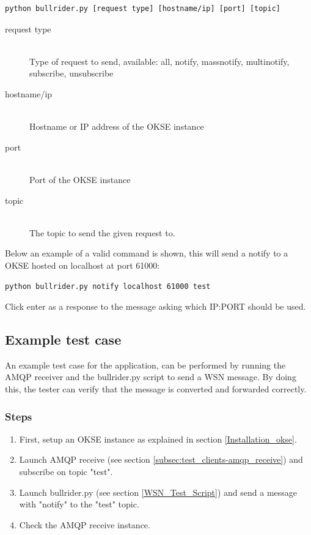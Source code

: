 \begin{verbatim}
python bullrider.py [request type] [hostname/ip] [port] [topic]
\end{verbatim}


\begin{description}
    \item[request type] \hfill \\
  Type of request to send, available: all, notify, massnotify, multinotify, subscribe, unsubscribe \hfill 
    \item[hostname/ip] \hfill \\
  Hostname or IP address of the OKSE instance \hfill 
    \item[port] \hfill \\
  Port of the OKSE instance \hfill 
    \item[topic] \hfill \\
  The topic to send the given request to. \hfill 
\end{description}
Below an example of a valid command is shown, this will send a notify to a OKSE hosted on localhost at port 61000:

\begin{verbatim}
python bullrider.py notify localhost 61000 test
\end{verbatim}
Click enter as a response to the message asking which IP:PORT should be used.

\subsection{Example test case}

An example test case for the application, can be performed by running the AMQP receiver and the bullrider.py script to send a WSN message. By doing this, the tester can verify that the message is converted and forwarded correctly.

\subsubsection{Steps}
\begin{enumerate}
\item First, setup an OKSE instance as explained in section  \ref{Installation_okse}. 
\item Launch AMQP receive (see section \ref{subsec:test_clients-amqp_receive}) and subscribe on topic "test". 
\item Launch bullrider.py (see section \ref{WSN_Test_Script}) and send a message with "notify" to the "test" topic. 
\item Check the AMQP receive instance.
\end{enumerate}

